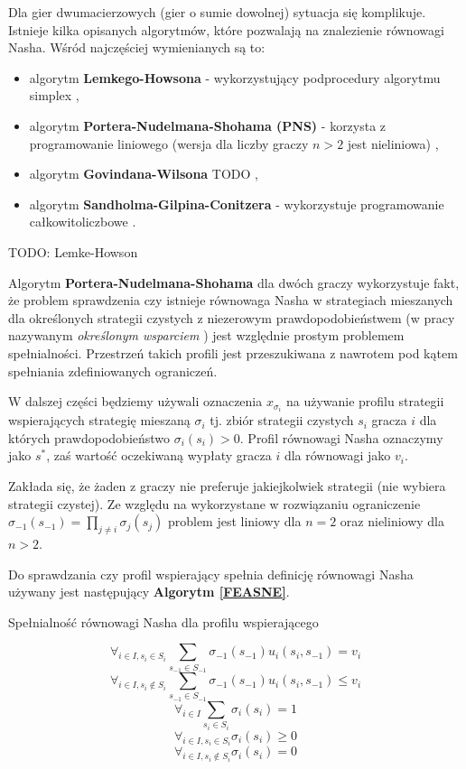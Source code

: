 \documentclass[polish]{standalone}
\begin{document}
Dla gier dwumacierzowych (gier o sumie dowolnej) sytuacja się komplikuje. Istnieje kilka opisanych algorytmów, które
pozwalają na znalezienie równowagi Nasha. Wśród najczęściej wymienianych są to:
\begin{itemize}
\item algorytm \textbf{Lemkego-Howsona} - wykorzystujący podprocedury algorytmu simplex \cite{LH-NE},
\item algorytm \textbf{Portera-Nudelmana-Shohama (PNS)} - korzysta z programowanie liniowego (wersja dla liczby graczy
$n > 2$ jest nieliniowa) \cite{PNS-NE},
\item algorytm \textbf{Govindana-Wilsona} TODO \cite{GR-NE},
\item algorytm \textbf{Sandholma-Gilpina-Conitzera} - wykorzystuje programowanie całkowitoliczbowe \cite{SCG-NE}.
\end{itemize}

TODO: Lemke-Howson

Algorytm \textbf{Portera-Nudelmana-Shohama} dla dwóch graczy wykorzystuje fakt, że problem sprawdzenia czy istnieje
równowaga Nasha w strategiach mieszanych dla określonych strategii czystych z niezerowym prawdopodobieństwem (w pracy
nazywanym \textit{określonym wsparciem} ) jest względnie prostym problemem
spełnialności. Przestrzeń takich profili jest przeszukiwana z nawrotem pod kątem spełniania zdefiniowanych ograniczeń.

W dalszej części będziemy używali oznaczenia $x_{\sigma_i}$ na używanie profilu strategii wspierających strategię
mieszaną $\sigma_i$ tj. zbiór strategii czystych $s_i$ gracza $i$ dla których prawdopodobieństwo $\sigma_i(s_i) > 0$.
Profil równowagi Nasha oznaczymy jako $s^{*}$, zaś wartość oczekiwaną wypłaty gracza $i$ dla równowagi jako $v_i$.

Zakłada się, że żaden z graczy nie preferuje jakiejkolwiek strategii (nie wybiera strategii czystej). Ze względu na
wykorzystane w rozwiązaniu ograniczenie $\sigma_{-1}(s_{-1}) = \prod_{j \ne i} \sigma_j(s_j)$ problem jest liniowy
dla $n = 2$ oraz nieliniowy dla $n > 2$.

Do sprawdzania czy profil wspierający spełnia definicję równowagi Nasha używany jest następujący \textbf{Algorytm
\ref{FEASNE}}.
\begin{algorithm}
\caption{Spełnialność równowagi Nasha dla profilu wspierającego}
\label{FEASNE}
\begin{algorithmic}
$$\forall_{i \in I, s_i \in S_i} \sum_{s_{-1} \in S_{-1}} \sigma_{-1}(s_{-1}) u_i(s_i, s_{-1}) = v_i$$
$$\forall_{i \in I, s_i \not\in S_i} \sum_{s_{-1} \in S_{-1}} \sigma_{-1}(s_{-1}) u_i(s_i, s_{-1}) \leq v_i$$
$$\forall_{i \in I} \sum_{s_i \in S_i} \sigma_i(s_i) = 1$$
$$\forall_{i \in I, s_i \in S_i} \sigma_i(s_i) \geq 0$$
$$\forall_{i \in I, s_i \not\in S_i} \sigma_i(s_i) = 0$$
\end{algorithmic}
\end{algorithm}
\end{document}
